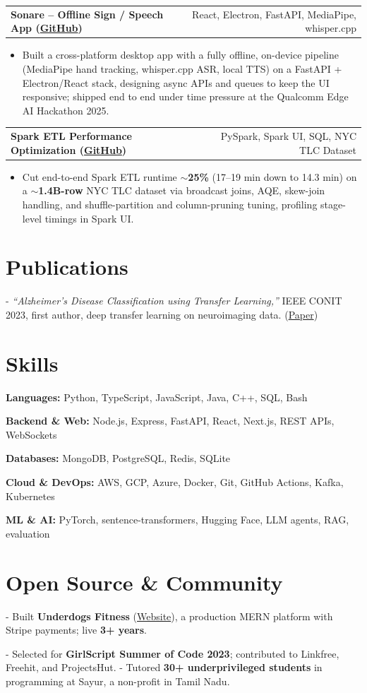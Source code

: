 \documentclass[letterpaper,11pt]{article}
\makeatletter
\newcommand{\projItem}[2]{%
  \vspace{2pt}
  \begin{tabular*}{\textwidth}{@{}l@{\extracolsep{\fill}}r@{}}
    \textbf{#1} & #2 \\
  \end{tabular*}\par\vspace{-3pt}
}
\newcommand{\skillLine}[2]{\textbf{#1:} #2\par\vspace{1.5pt}}
\newcommand{\inlineBlock}[1]{{\setlength{\leftskip}{0.18in}\small #1\par}}
\makeatother
\begin{document}
\projItem{Sonare -- Offline Sign / Speech App {\normalfont\small(\href{https://github.com/Deva-1903/Qualcomm-Sep25-Team-Sonare}{GitHub})}}{React, Electron, FastAPI, MediaPipe, whisper.cpp}
\begin{itemize}
  \item Built a cross-platform desktop app with a fully offline, on-device pipeline (MediaPipe hand tracking, whisper.cpp ASR, local TTS) on a FastAPI + Electron/React stack, designing async APIs and queues to keep the UI responsive; shipped end to end under time pressure at the Qualcomm Edge AI Hackathon 2025.
\end{itemize}

\projItem{Spark ETL Performance Optimization {\normalfont\small(\href{https://github.com/Deva-1903/Spark-ETL-Optimization}{GitHub})}}{PySpark, Spark UI, SQL, NYC TLC Dataset}
\begin{itemize}
  \item Cut end-to-end Spark ETL runtime \textbf{$\sim$25\%} (17--19 min down to 14.3 min) on a \textbf{$\sim$1.4B-row} NYC TLC dataset via broadcast joins, AQE, skew-join handling, and shuffle-partition and column-pruning tuning, profiling stage-level timings in Spark UI.
\end{itemize}

\section{Publications}
\vspace{2pt}
\inlineBlock{- \textit{``Alzheimer's Disease Classification using Transfer Learning,''} IEEE CONIT 2023, first author, deep transfer learning on neuroimaging data. {\normalfont\small(\href{https://ieeexplore.ieee.org/document/10205760}{Paper})}}

\section{Skills}
\skillLine{Languages}{Python, TypeScript, JavaScript, Java, C++, SQL, Bash}
\skillLine{Backend \& Web}{Node.js, Express, FastAPI, React, Next.js, REST APIs, WebSockets}
\skillLine{Databases}{MongoDB, PostgreSQL, Redis, SQLite}
\skillLine{Cloud \& DevOps}{AWS, GCP, Azure, Docker, Git, GitHub Actions, Kafka, Kubernetes}
\skillLine{ML \& AI}{PyTorch, sentence-transformers, Hugging Face, LLM agents, RAG, evaluation}

\section{Open Source \& Community}
\inlineBlock{- Built \textbf{Underdogs Fitness} (\href{https://www.underdogsfitness.in/}{Website}), a production MERN platform with Stripe payments; live \textbf{3+ years}.}
\inlineBlock{- Selected for \textbf{GirlScript Summer of Code 2023}; contributed to Linkfree, Freehit, and ProjectsHut. - Tutored \textbf{30+ underprivileged students} in programming at Sayur, a non-profit in Tamil Nadu.}
\end{document}
